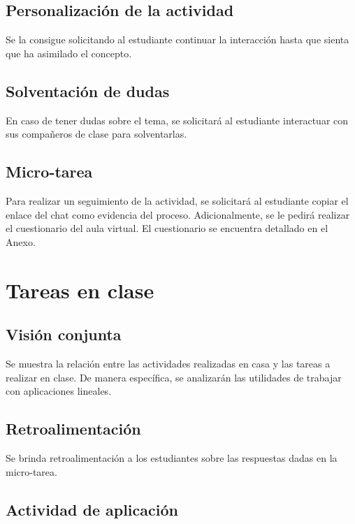\documentclass[a4,11pt]{aleph-notas}
\begin{document}
\subsection{Personalización de la actividad}

Se la consigue solicitando al estudiante continuar la interacción hasta que sienta que ha asimilado el concepto.

\subsection{Solventación de dudas}

En caso de tener dudas sobre el tema, se solicitará al estudiante interactuar con sus compañeros de clase para solventarlas.

\subsection{Micro-tarea}

Para realizar un seguimiento de la actividad, se solicitará al estudiante copiar el enlace del chat como evidencia del proceso. Adicionalmente, se le pedirá realizar el cuestionario del aula virtual. El cuestionario se encuentra detallado en el Anexo.

\section{Tareas en clase}

\subsection{Visión conjunta}

Se muestra la relación entre las actividades realizadas en casa y las tareas a realizar en clase. De manera específica, se analizarán las utilidades de trabajar con aplicaciones lineales.

\subsection{Retroalimentación}

Se brinda retroalimentación a los estudiantes sobre las respuestas dadas en la micro-tarea.

\subsection{Actividad de aplicación}
\end{document}
